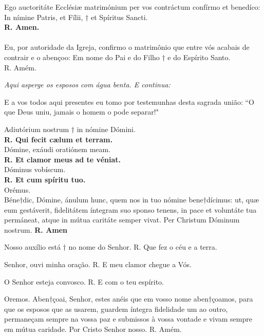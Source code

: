 \begin{multicols}{2}
\noindent
Ego auctoritáte Ecclésiæ matrimónium per vos contráctum confírmo et benedíco: In nímine Patris, et Fílii, $\dagger$ et Spíritus Sancti. 
\\ \textbf{R. Amen.}
\\
\\Eu, por autoridade da Igreja, confirmo o matrimônio que entre vós acabais de contrair e o abençoo: Em nome do Pai e do Filho $\dagger$ e do Espírito Santo.
\\ R. Amém.
\end{multicols}

\begin{center}
	\textit{Aqui asperge os esposos com água benta. E continua:}
\end{center}
\noindent
E a vos todos aqui presentes eu tomo por testemunhas desta sagrada união:
``O que Deus uniu, jamais o homem o pode separar!"

\begin{multicols}{2}
\noindent
Adiutórium nostrum $\dagger$ in nómine Dómini.
\\\textbf{R. Qui fecit cælum et terram.}
\\
\noindent Dómine, exáudi oratiónem meam.
\\\textbf{R. Et clamor meus ad te véniat.}
\\
\noindent Dóminus vobíscum.
\\\textbf{R. Et cum spíritu tuo.}
\\
\noindent Orémus.
\\Béne$\dagger$dic, Dómine, ánulum hunc, quem nos in tuo nómine bene$\dagger$dícimus: ut, quæ eum gestáverit, fidelitátem íntegram suo sponso tenens, in pace et voluntáte tua permáneat, atque in mútua caritáte semper vivat. Per Christum Dóminum nostrum.
\textbf{R. Amen}

Nosso auxílio está $\dagger$ no nome do Senhor.
R. Que fez o céu e a terra.

Senhor, ouvi minha oração.
R. E meu clamor chegue a Vós.

O Senhor esteja convosco.
R. E com o teu espírito.

Oremos.
Aben$\dagger$çoai, Senhor, estes anéis que
em vosso nome aben$\dagger$çoamos, para
que os esposos que as usarem,
guardem íntegra fidelidade um ao
outro, permaneçam sempre na vossa
paz e submissos à vossa vontade e
vivam sempre em mútua caridade. Por
Cristo Senhor nosso.
R. Amém.
\end{multicols}

